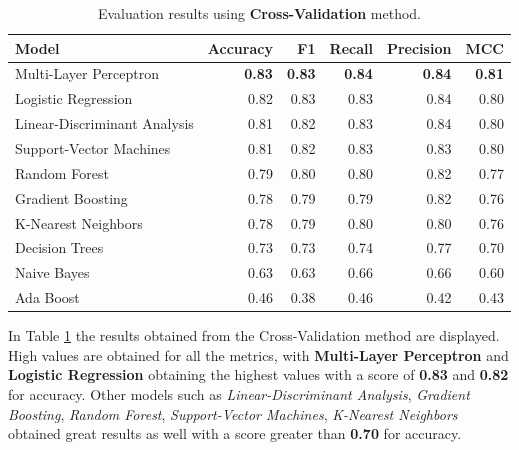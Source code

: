             \begin{table}[htbp]
                \centering
                \caption{Evaluation results using \textbf{Cross-Validation} method.}
                \label{tab:feature_engineering_approach_cv}
                \begin{tabular}{lrrrrr}
                    \toprule
                    \textbf{Model} & \textbf{Accuracy} & \textbf{F1} & \textbf{Recall} & \textbf{Precision} & \textbf{MCC} \\
                    \midrule
                    Multi-Layer Perceptron & \textbf{0.83} & \textbf{0.83} & \textbf{0.84} & \textbf{0.84} & \textbf{0.81} \\
                    Logistic Regression & 0.82 & 0.83 & 0.83 & 0.84 & 0.80 \\
                    Linear-Discriminant Analysis & 0.81 & 0.82 & 0.83 & 0.84 & 0.80 \\
                    Support-Vector Machines & 0.81 & 0.82 & 0.83 & 0.83 & 0.80 \\
                    Random Forest & 0.79 & 0.80 & 0.80 & 0.82 & 0.77 \\
                    Gradient Boosting & 0.78 & 0.79 & 0.79 & 0.82 & 0.76 \\
                    K-Nearest Neighbors & 0.78 & 0.79 & 0.80 & 0.80 & 0.76 \\
                    Decision Trees & 0.73 & 0.73 & 0.74 & 0.77 & 0.70 \\
                    Naive Bayes & 0.63 & 0.63 & 0.66 & 0.66 & 0.60 \\
                    Ada Boost & 0.46 & 0.38 & 0.46 & 0.42 & 0.43 \\
                    \bottomrule
                \end{tabular}
            \end{table}

            In Table \ref{tab:feature_engineering_approach_cv} the results obtained from the Cross-Validation method are displayed. High values are obtained for all the metrics, with \textbf{Multi-Layer Perceptron}  and \textbf{Logistic Regression} obtaining the highest values with a score of \textbf{0.83} and \textbf{0.82} for accuracy. Other models such as \textit{Linear-Discriminant Analysis}, \textit{Gradient Boosting}, \textit{Random Forest}, \textit{Support-Vector Machines}, \textit{K-Nearest Neighbors} obtained great results as well with a score greater than \textbf{0.70} for accuracy. 

